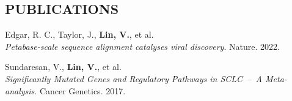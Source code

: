 \documentclass[line,resmargin]{res}
\begin{document}
\begin{resume}




\section{PUBLICATIONS}
    Edgar, R. C., Taylor, J., \textbf{Lin, V.}, et al. \\
    \textit{Petabase-scale sequence alignment catalyses viral discovery}. Nature. 2022.

Sundaresan, V., \textbf{Lin, V.}, et al. \\
    \textit{Significantly Mutated Genes and Regulatory Pathways in SCLC~--~A Meta-analysis}. Cancer Genetics. 2017.

\end{resume}
\end{document}
